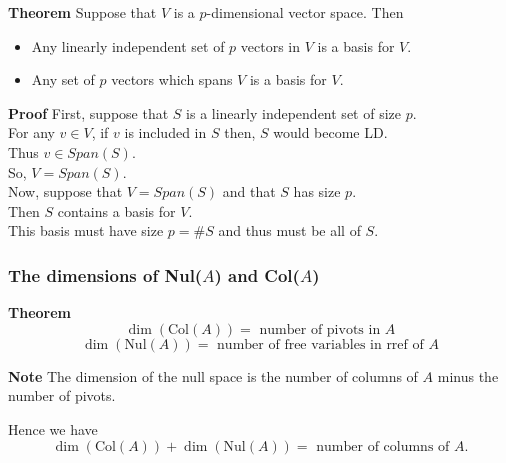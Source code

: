  \begin{frame}[fragile]
\textbf{Theorem}
Suppose that $V$ is a $p$-dimensional vector space.  Then 
\begin{itemize}
\item Any linearly independent set of $p$ vectors in $V$ is a basis for $V$.
\item Any set of $p$ vectors which spans $V$ is a basis for $V$.
\end{itemize}



\textbf{Proof}
First, suppose that $S$ is a linearly independent set of size $p$.    \\
For any $v\in V$, if $v$ is included in $S$ then, $S$ would become LD.  \\ 
Thus $v\in Span(S)$.  \\ 
So, $V=Span(S)$.  \\ 

Now, suppose that $V=Span(S)$ and that $S$ has size $p$.  \\ 
Then $S$ contains a basis for $V$.  \\ 
This basis must have size $p=\#S$ and thus must be all of $S$.

\end{frame}






 \begin{frame}[fragile]\frametitle{The dimensions of Nul($A$) and Col($A$)}
\textbf{Theorem}
\[
\dim (\text{Col}(A)) = \text{ number of pivots in }A
\]
\[
\dim (\text{Nul}(A)) = \text{ number of free variables in rref of }A
\]



\textbf{Note}
The dimension of the null space is the number of columns of $A$ minus the number of 
pivots.


Hence we have 
\[
\dim (\text{Col}(A)) + \dim(\text{Nul}(A)) = \text{ number of columns of }A.
\]

\end{frame}





